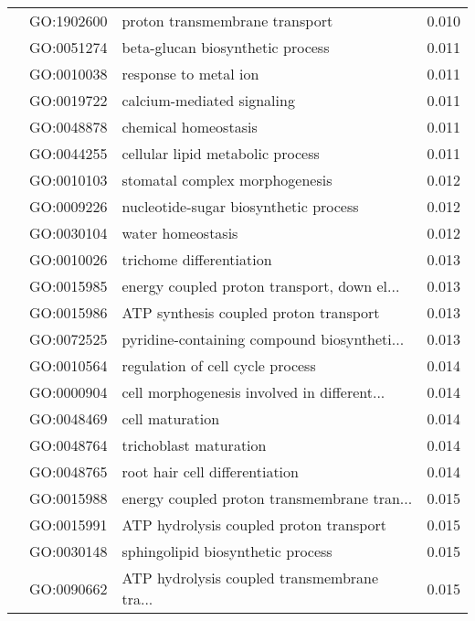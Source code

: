 \begin{longtable}{lllr}
   & GO:1902600 &               proton transmembrane transport &         0.010 \\
   & GO:0051274 &             beta-glucan biosynthetic process &         0.011 \\
   & GO:0010038 &                        response to metal ion &         0.011 \\
   & GO:0019722 &                   calcium-mediated signaling &         0.011 \\
   & GO:0048878 &                         chemical homeostasis &         0.011 \\
   & GO:0044255 &             cellular lipid metabolic process &         0.011 \\
   & GO:0010103 &               stomatal complex morphogenesis &         0.012 \\
   & GO:0009226 &        nucleotide-sugar biosynthetic process &         0.012 \\
   & GO:0030104 &                            water homeostasis &         0.012 \\
   & GO:0010026 &                     trichome differentiation &         0.013 \\
   & GO:0015985 &  energy coupled proton transport, down el... &         0.013 \\
   & GO:0015986 &       ATP synthesis coupled proton transport &         0.013 \\
   & GO:0072525 &  pyridine-containing compound biosyntheti... &         0.013 \\
   & GO:0010564 &             regulation of cell cycle process &         0.014 \\
   & GO:0000904 &  cell morphogenesis involved in different... &         0.014 \\
   & GO:0048469 &                              cell maturation &         0.014 \\
   & GO:0048764 &                       trichoblast maturation &         0.014 \\
   & GO:0048765 &               root hair cell differentiation &         0.014 \\
   & GO:0015988 &  energy coupled proton transmembrane tran... &         0.015 \\
   & GO:0015991 &      ATP hydrolysis coupled proton transport &         0.015 \\
   & GO:0030148 &            sphingolipid biosynthetic process &         0.015 \\
   & GO:0090662 &  ATP hydrolysis coupled transmembrane tra... &         0.015 \\

\end{longtable}
